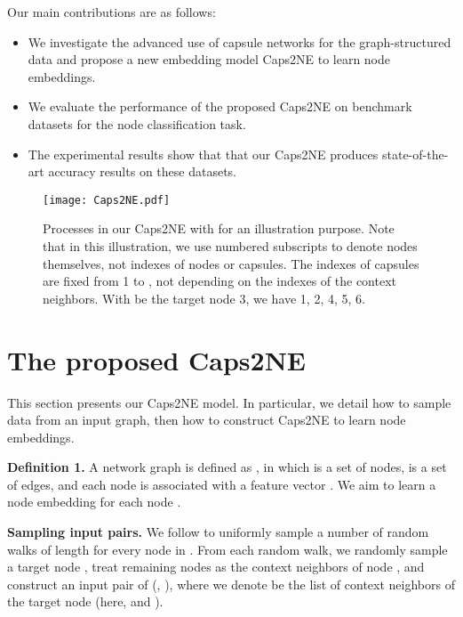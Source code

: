 \documentclass[sigconf]{acmart}
\begin{document}
Our main contributions are as follows:

\begin{itemize}

\item We investigate the advanced use of capsule networks for the graph-structured data and propose a new embedding model Caps2NE to learn node embeddings.

\item We evaluate the performance of the proposed Caps2NE on benchmark datasets for the node classification task.

\item The experimental results show that that our Caps2NE produces state-of-the-art accuracy results on these datasets.

\end{itemize}

\begin{figure*}
\centering
\texttt{[image: Caps2NE.pdf]}
\caption{Processes in our Caps2NE with  for an illustration purpose. {Note that in this illustration, we use numbered subscripts to denote nodes themselves, not indexes of nodes or capsules.} The indexes of capsules are fixed from 1 to , not depending on the indexes of the context neighbors. With  be the target node 3, we have    1,   2,   4,   5,  6.}
\label{fig:Caps2NE}
\end{figure*}

\section{The proposed Caps2NE}
\label{sec:ourmodel}

This section presents our Caps2NE model. In particular, 
we detail how to sample data from an input graph, then how to construct Caps2NE to learn node embeddings.



\textbf{Definition 1.} A network graph  is defined as , in which  is a set of nodes,  is a set of edges, and each node  is associated with a feature vector .
We aim to learn a node embedding  for each node .






\textbf{Sampling input pairs.} We follow \citet{Perozzi:2014} to uniformly sample a number  of random walks of length  for every node in . 
From each random walk, we randomly sample a target node , treat  remaining nodes as the context neighbors of node , and construct an input pair of (, ), where we denote  be the list of context neighbors  of the target node  (here,  and ). 
\end{document}
